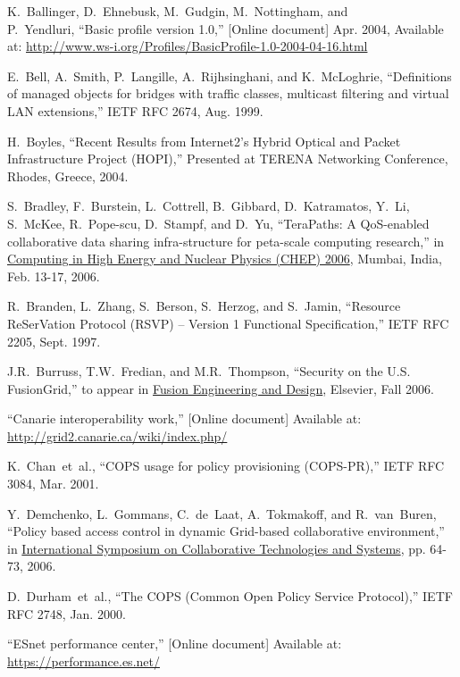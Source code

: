 \documentclass[conference]{IEEEtran}
\begin{document}
\begin{thebibliography}{1}

K.~Ballinger, D.~Ehnebusk, M.~Gudgin, M.~Nottingham, and~~~~\\
P.~Yendluri, ``Basic profile version 1.0,'' [Online document] Apr. 2004,
Available at:
\url{http://www.ws-i.org/Profiles/BasicProfile-1.0-2004-04-16.html}

E.~Bell, A.~Smith, P.~Langille, A.~Rijhsinghani, and K.~McLoghrie,
``Definitions of managed objects for bridges with traffic classes, multicast
filtering and virtual LAN extensions,''
IETF RFC 2674, Aug. 1999.

H.~Boyles,
``Recent Results from Internet2's Hybrid Optical and Packet Infrastructure Project (HOPI),''
Presented at TERENA Networking Conference, Rhodes, Greece, 2004.

S.~Bradley, F.~Burstein, L.~Cottrell, B.~Gibbard, D.~Katramatos, Y.~Li,
S.~McKee, R.~Pope-scu, D.~Stampf, and D.~Yu,
``TeraPaths: A QoS-enabled collaborative data sharing infra-structure for
peta-scale computing research,''
in \underline{Computing in High Energy and Nuclear Physics (CHEP) 2006},
Mumbai, India, Feb. 13-17, 2006.

R.~Branden, L.~Zhang, S.~Berson, S.~Herzog, and S.~Jamin,
``Resource ReSerVation Protocol (RSVP) -- Version 1 Functional
Specification,'' IETF RFC 2205, Sept. 1997.

J.R.~Burruss, T.W.~Fredian, and M.R.~Thompson,
``Security on the U.S. FusionGrid,''
to appear in \underline{Fusion Engineering and Design}, Elsevier, Fall 2006.

``Canarie interoperability work,'' [Online document] Available at: \\
\url{http://grid2.canarie.ca/wiki/index.php/}

K.~Chan~et~al., ``COPS usage for policy provisioning (COPS-PR),''
IETF RFC 3084, Mar. 2001.

Y.~Demchenko, L.~Gommans, C.~de~Laat, A.~Tokmakoff, and R.~van~Buren,
``Policy based access control in dynamic Grid-based collaborative environment,''
in \underline{International Symposium on Collaborative Technologies and Systems},
pp. 64-73, 2006.

D.~Durham~et~al.,
``The COPS (Common Open Policy Service Protocol),'' IETF RFC 2748, Jan. 2000.

``ESnet performance center,'' [Online document] Available at: \\
\url{https://performance.es.net/}


\end{thebibliography}
\end{document}
